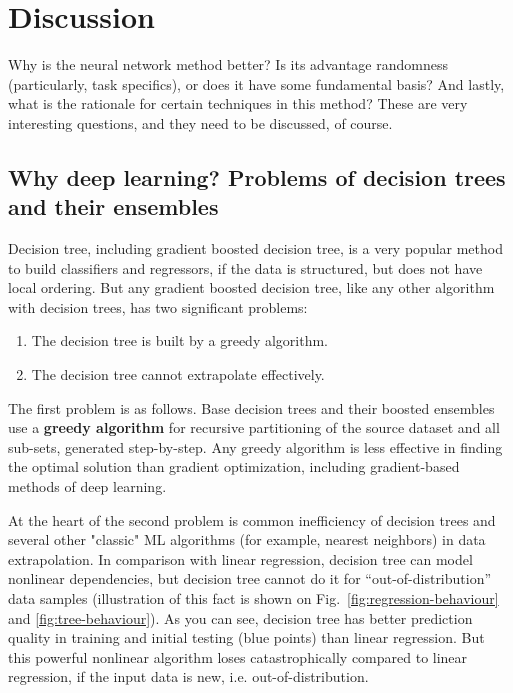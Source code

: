 \documentclass{article}
\begin{document}
\section{Discussion}
\label{discussion}

Why is the neural network method better? Is its advantage randomness (particularly, task specifics), or does it have some fundamental basis? And lastly, what is the rationale for certain techniques in this method? These are very interesting questions, and they need to be discussed, of course.

\subsection{Why deep learning? Problems of decision trees and their ensembles}

Decision tree, including gradient boosted decision tree, is a very popular method to build classifiers and regressors, if the data is structured, but does not have local ordering. But any gradient boosted decision tree, like any other algorithm with decision trees, has two significant problems:

\begin{enumerate}
    \item The decision tree is built by a greedy algorithm.
    \item The decision tree cannot extrapolate effectively.
\end{enumerate}

The first problem is as follows. Base decision trees \cite{Quinlan1986} and their boosted ensembles \cite{friedman2001} use a \textbf{greedy algorithm} for recursive partitioning of the source dataset and all sub-sets, generated step-by-step. Any greedy algorithm is less effective in finding the optimal solution than gradient optimization, including gradient-based methods of deep learning.

At the heart of the second problem is common inefficiency of decision trees and several other "classic" ML algorithms (for example, nearest neighbors) in data extrapolation. In comparison with linear regression, decision tree can model nonlinear dependencies, but decision tree cannot do it for “out-of-distribution” data samples (illustration of this fact is shown on Fig.~\ref{fig:regression-behaviour} and \ref{fig:tree-behaviour}). As you can see, decision tree has better prediction quality in training and initial testing (blue points) than linear regression. But this powerful nonlinear algorithm loses catastrophically compared to linear regression, if the input data is new, i.e. out-of-distribution.
\end{document}
